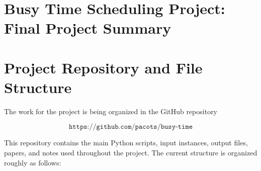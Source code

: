 \documentclass[12pt]{article}
\begin{document}
\section*{Busy Time Scheduling Project: Final Project Summary}

\section*{Project Repository and File Structure}

The work for the project is being organized in the GitHub repository

\[
\texttt{https://github.com/pacots/busy-time}
\]

This repository contains the main Python scripts, input instances, output files,
papers, and notes used throughout the project. The current structure is organized
roughly as follows:
\end{document}
